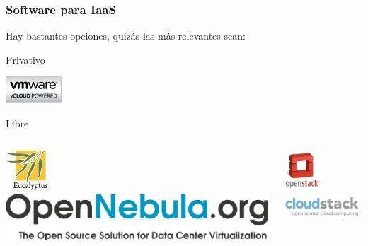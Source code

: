 \documentclass{beamer}
\begin{document}
\begin{frame}
  \frametitle{Software para IaaS}
  Hay bastantes opciones, quizás las más relevantes sean:
  \begin{description}
  \item[Privativo]
  \end{description}
  \begin{center}
    \includegraphics[height=1cm]{../img/vcloud.png}
  \end{center}
  \begin{description}
  \item[Libre]
  \end{description}
  \begin{columns}
    \begin{center}
      \includegraphics[height=1.5cm]{../img/eucalyptus.png}\\
      \vspace{.5cm}
      \includegraphics[height=.75cm]{../img/opennebula.png}
    \end{center}
    \begin{center}
      \includegraphics[height=1.5cm]{../img/openstack.jpg}\\
      \vspace{.5cm}
      \includegraphics[height=1cm]{../img/cloudstack.png}      
    \end{center}
  \end{columns}
\end{frame}
\end{document}
